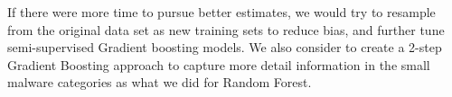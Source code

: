 \documentclass[11pt]{article}
\begin{document}
If there were more time to pursue better estimates, we would try to resample from the original data set as new training sets to reduce bias, and further tune semi-supervised Gradient boosting models. We also consider to create a 2-step Gradient Boosting approach to capture more detail information in the small malware categories as what we did for Random Forest.
\end{document}
